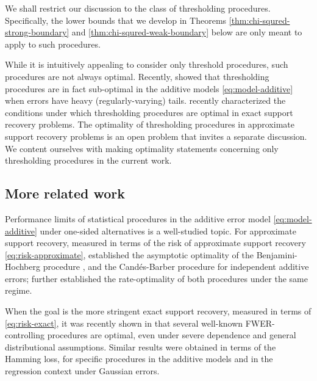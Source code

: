 We shall restrict our discussion to the class of thresholding procedures.
Specifically, the lower bounds that we develop in Theorems \ref{thm:chi-squred-strong-boundary} and \ref{thm:chi-squred-weak-boundary} below are only meant to apply to such procedures.

\begin{remark}
While it is intuitively appealing to consider only threshold procedures, such procedures are not always optimal.
Recently, \citet{chen2018scan} showed that thresholding procedures are in fact sub-optimal in the additive models \eqref{eq:model-additive} when errors have heavy (regularly-varying) tails. 
\citet{gao2018fundamental} recently characterized the conditions under which thresholding procedures are optimal in exact support recovery problems.
The optimality of thresholding procedures in approximate support recovery problems is an open problem that invites a separate discussion. 
We content ourselves with making optimality statements concerning only thresholding procedures in the current work.
\end{remark}


\subsection{More related work}

Performance limits of statistical procedures in the additive error model \eqref{eq:model-additive} under one-sided alternatives is a well-studied topic.
For approximate support recovery, measured in terms of the risk of approximate support recovery \eqref{eq:risk-approximate}, \citet*{arias2017distribution} established the asymptotic optimality of the Benjamini-Hochberg procedure \cite{benjamini1995controlling}, and the Cand\'es-Barber procedure \cite{barber2015controlling} for independent additive errors;
\citet{rabinovich2017optimal} further established the rate-optimality of both procedures under the same regime.

When the goal is the more stringent exact support recovery, measured in terms of \eqref{eq:risk-exact}, it was recently shown in \cite{gao2018fundamental} that several well-known FWER-controlling procedures are optimal, even under severe dependence and general distributional assumptions.
Similar results were obtained in terms of the Hamming loss, for specific procedures in the additive models \cite{butucea2018variable} and in the regression context \cite{ji2012ups,jin2014optimality} under Gaussian errors.

